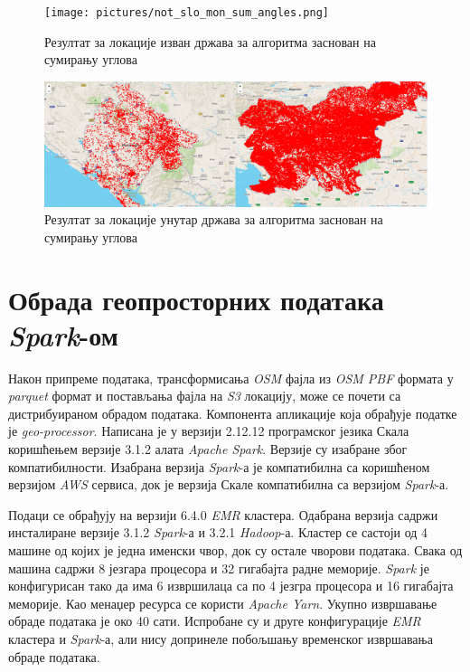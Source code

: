 \documentclass[12pt,oneside]{memoir}
\begin{document}
\begin{figure}[!ht]
  \centering
  \texttt{[image: pictures/not\_slo\_mon\_sum\_angles.png]}
  \caption{Резултат за локације изван држава за алгоритма заснован на сумирању углова}
  \label{fig:not_slo_mon_example}
\end{figure}

\begin{figure}[!ht]
  \centering
  \includegraphics[width=1\textwidth]{pictures/slo_mon_sum_angles.png}
  \caption{Резултат за локације унутар држава за алгоритма заснован на сумирању углова}
  \label{fig:slo_mon_example}
\end{figure}

\section{Обрада геопросторних података \textit{Spark}-ом}
\label{sec:osm_spark_obrada}

Након припреме података, трансформисања \textit{OSM} фајла из \textit{OSM PBF} формата у \textit{parquet} формат и постављања фајла на \textit{S3} локацију, може се почети са дистрибуираном обрадом података. Компонента апликације која обрађује податке је \textit{geo-processor}. Написана је у верзији 2.12.12 програмског језика Скала коришћењем верзије 3.1.2 алата \textit{Apache Spark}. Верзије су изабране због компатибилности. Изабрана верзија \textit{Spark}-а је компатибилна са коришћеном верзијом \textit{AWS} сервиса, док је верзија Скале компатибилна са верзијом \textit{Spark}-а.

Подаци се обрађују на верзији 6.4.0 \textit{EMR} кластера. Одабрана верзија садржи инсталиране верзије 3.1.2 \textit{Spark}-а и 3.2.1 \textit{Hadoop}-а. Кластер се састоји од 4 машине од којих је једна именски чвор, док су остале чворови података. Свака од машина садржи 8 језгара процесора и 32 гигабајта радне меморије. \textit{Spark} је конфигурисан тако да има 6 извршилаца са по 4 језгра процесора и 16 гигабајта меморије. Као менаџер ресурса се користи \textit{Apache Yarn}. Укупно извршавање обраде података је око 40 сати. Испробане су и друге конфигурације \textit{EMR} кластера и \textit{Spark}-а, али нису допринеле побољшању временског извршавања обраде података. 
\end{document}
